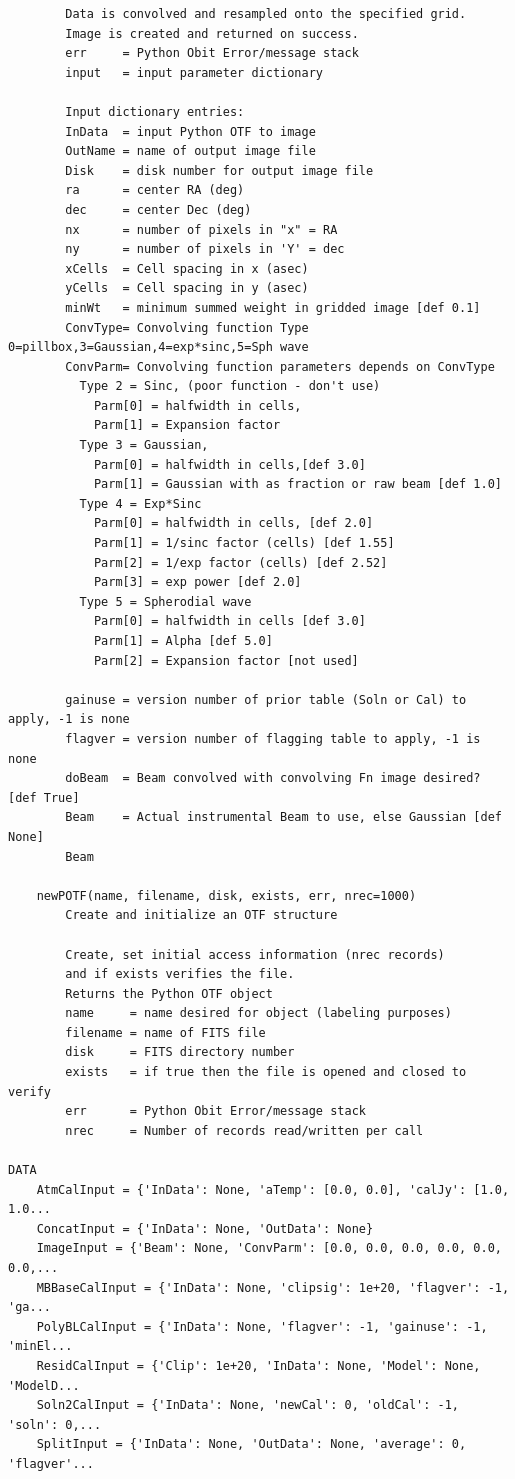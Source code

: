 \documentclass[11pt]{report}
\begin{document}
\begin{verbatim}
        Data is convolved and resampled onto the specified grid.
        Image is created and returned on success.
        err     = Python Obit Error/message stack
        input   = input parameter dictionary
        
        Input dictionary entries:
        InData  = input Python OTF to image
        OutName = name of output image file
        Disk    = disk number for output image file
        ra      = center RA (deg)
        dec     = center Dec (deg)
        nx      = number of pixels in "x" = RA
        ny      = number of pixels in 'Y' = dec
        xCells  = Cell spacing in x (asec)
        yCells  = Cell spacing in y (asec)
        minWt   = minimum summed weight in gridded image [def 0.1]
        ConvType= Convolving function Type 0=pillbox,3=Gaussian,4=exp*sinc,5=Sph wave
        ConvParm= Convolving function parameters depends on ConvType
          Type 2 = Sinc, (poor function - don't use)
            Parm[0] = halfwidth in cells,
            Parm[1] = Expansion factor
          Type 3 = Gaussian,
            Parm[0] = halfwidth in cells,[def 3.0]
            Parm[1] = Gaussian with as fraction or raw beam [def 1.0]
          Type 4 = Exp*Sinc
            Parm[0] = halfwidth in cells, [def 2.0]
            Parm[1] = 1/sinc factor (cells) [def 1.55]
            Parm[2] = 1/exp factor (cells) [def 2.52]
            Parm[3] = exp power [def 2.0]
          Type 5 = Spherodial wave 
            Parm[0] = halfwidth in cells [def 3.0]
            Parm[1] = Alpha [def 5.0]
            Parm[2] = Expansion factor [not used]
        
        gainuse = version number of prior table (Soln or Cal) to apply, -1 is none
        flagver = version number of flagging table to apply, -1 is none
        doBeam  = Beam convolved with convolving Fn image desired? [def True]
        Beam    = Actual instrumental Beam to use, else Gaussian [def None]
        Beam
    
    newPOTF(name, filename, disk, exists, err, nrec=1000)
        Create and initialize an OTF structure
        
        Create, set initial access information (nrec records)
        and if exists verifies the file.
        Returns the Python OTF object
        name     = name desired for object (labeling purposes)
        filename = name of FITS file
        disk     = FITS directory number
        exists   = if true then the file is opened and closed to verify
        err      = Python Obit Error/message stack
        nrec     = Number of records read/written per call

DATA
    AtmCalInput = {'InData': None, 'aTemp': [0.0, 0.0], 'calJy': [1.0, 1.0...
    ConcatInput = {'InData': None, 'OutData': None}
    ImageInput = {'Beam': None, 'ConvParm': [0.0, 0.0, 0.0, 0.0, 0.0, 0.0,...
    MBBaseCalInput = {'InData': None, 'clipsig': 1e+20, 'flagver': -1, 'ga...
    PolyBLCalInput = {'InData': None, 'flagver': -1, 'gainuse': -1, 'minEl...
    ResidCalInput = {'Clip': 1e+20, 'InData': None, 'Model': None, 'ModelD...
    Soln2CalInput = {'InData': None, 'newCal': 0, 'oldCal': -1, 'soln': 0,...
    SplitInput = {'InData': None, 'OutData': None, 'average': 0, 'flagver'...
\end{verbatim}
\end{document}
